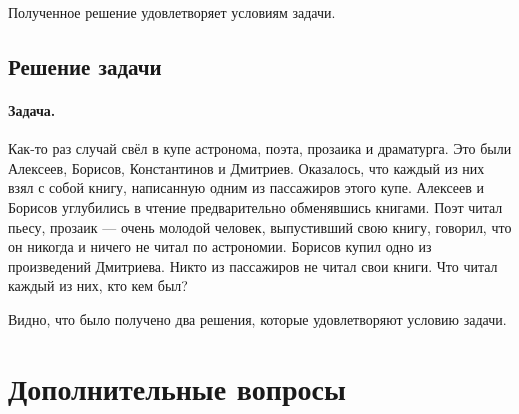 
Полученное решение удовлетворяет условиям задачи.

\subsection{Решение задачи}

\paragraph{Задача.} Как-то раз случай свёл в купе астронома, поэта, прозаика и драматурга. Это были Алексеев, Борисов, Константинов и Дмитриев. Оказалось, что каждый из них взял с собой книгу, написанную одним из пассажиров этого купе. Алексеев и Борисов углубились в чтение предварительно обменявшись книгами. Поэт читал пьесу, прозаик — очень молодой человек, выпустивший свою книгу, говорил, что он никогда и ничего не читал по астрономии. Борисов купил одно из произведений Дмитриева. Никто из пассажиров не читал свои книги. Что читал каждый из них, кто кем был?


Видно, что было получено два решения, которые удовлетворяют условию задачи.

\section{Дополнительные вопросы}

